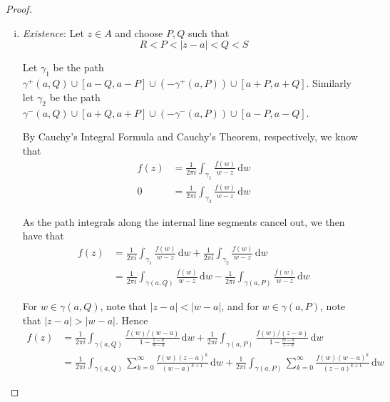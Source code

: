 \documentclass[10pt,fleqn]{article}
\newcommand{\diff}{\,\mathrm{d}}
\theoremstyle{definition} \newtheorem{defn}{Definition}[section]
\theoremstyle{plain}      \newtheorem{thm}[defn]{Theorem}
\theoremstyle{definition} \newtheorem{prop}[defn]{Proposition}
\theoremstyle{plain}      \newtheorem{lem}[defn]{Lemma}
\theoremstyle{definition} \newtheorem{cor}[defn]{Corollary}
\theoremstyle{definition} \newtheorem{ex}[defn]{Example}
\theoremstyle{definition} \newtheorem{rem}[defn]{Remark}
\begin{document}
\begin{proof}
    \begin{enumerate}[(i)]
        \item \emph{Existence}:
        Let $z\in A$ and choose $P,Q$ such that
        \[
            R<P<|z-a|<Q<S
        \]

        Let $\gamma_1$ be the path $\gamma^+(a,Q)\cup[a-Q,a-P]\cup(-\gamma^+(a,P))\cup[a+P,a+Q]$.
        Similarly let $\gamma_2$ be the path $\gamma^-(a,Q)\cup[a+Q,a+P]\cup(-\gamma^-(a,P))\cup[a-P,a-Q]$.

        By Cauchy's Integral Formula and Cauchy's Theorem, respectively, we know that
        \begin{align*}
            f(z)
            &=
            \frac{1}{2\pi i}\int_{\gamma_1}\frac{f(w)}{w-z}\diff w\\
            0
            &=
            \frac{1}{2\pi i}\int_{\gamma_2}\frac{f(w)}{w-z}\diff w
        \end{align*}

        As the path integrals along the internal line segments cancel out, we then have that
        \begin{align*}
            f(z)
            &=
            \frac{1}{2\pi i}\int_{\gamma_1}\frac{f(w)}{w-z}\diff w+\frac{1}{2\pi i}\int_{\gamma_2}\frac{f(w)}{w-z}\diff w\\
            &=
            \frac{1}{2\pi i}\int_{\gamma(a,Q)}\frac{f(w)}{w-z}\diff w-\frac{1}{2\pi i}\int_{\gamma(a,P)}\frac{f(w)}{w-z}\diff w
        \end{align*}

        For $w\in\gamma(a,Q)$, note that $|z-a|<|w-a|$, and for $w\in\gamma(a,P)$, note that $|z-a|>|w-a|$.
        Hence
        \begin{align*}
            f(z)
            &=
            \frac{1}{2\pi i}\int_{\gamma(a,Q)}\frac{f(w)/(w-a)}{1-\frac{z-a}{w-a}}\diff w+\frac{1}{2\pi i}\int_{\gamma(a,P)}\frac{f(w)/(z-a)}{1-\frac{w-a}{z-a}}\diff w\\
            &=
            \frac{1}{2\pi i}\int_{\gamma(a,Q)}\sum_{k=0}^{\infty}\frac{f(w)(z-a)^k}{(w-a)^{k+1}}\diff w+\frac{1}{2\pi i}\int_{\gamma(a,P)}\sum_{k=0}^{\infty}\frac{f(w)(w-a)^k}{(z-a)^{k+1}}\diff w
        \end{align*}


\end{enumerate}
\end{proof}
\end{document}
